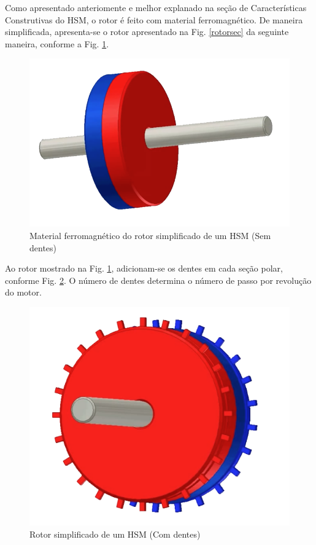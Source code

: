 	Como apresentado anteriomente e melhor explanado na seção de Características Construtivas do HSM, o rotor é feito com material ferromagnético. De maneira simplificada, apresenta-se o rotor apresentado na Fig. \ref{rotorsec} da seguinte maneira, conforme a Fig. \ref{rotor1}.
	
	\begin{figure}[H]
		\centering 
		\includegraphics[scale=0.2]{images/hsm_operation/rotormag1}
		\caption{Material ferromagnético do rotor simplificado de um HSM (Sem dentes)}
		\label{rotor1}
	\end{figure}
	
	Ao rotor mostrado na Fig. \ref{rotor1}, adicionam-se os dentes em cada seção polar, conforme Fig. \ref{rotor2}. O número de dentes determina o número de passo por revolução do motor.
	
	\begin{figure}[H]
		\centering 
		\includegraphics[scale=0.2]{images/hsm_operation/rotormag2}
		\caption{Rotor simplificado de um HSM (Com dentes)}
		\label{rotor2}
	\end{figure}
	
